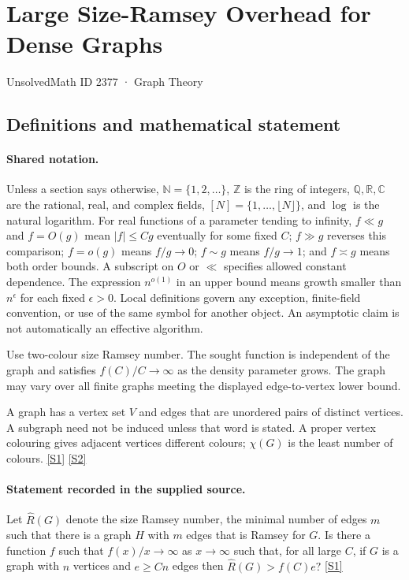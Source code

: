 \documentclass[11pt,a4paper]{article}
\newcommand{\N}{\mathbb{N}}
\newcommand{\Z}{\mathbb{Z}}
\newcommand{\Q}{\mathbb{Q}}
\newcommand{\R}{\mathbb{R}}
\newcommand{\C}{\mathbb{C}}
\newcommand{\sref}[2]{\hyperlink{source:#1:#2}{[S#2]}}
\begin{document}

\setcounter{section}{2376}

\section{Large Size-Ramsey Overhead for Dense Graphs}\label{2377}

{\small\sffamily UnsolvedMath ID 2377 · Graph Theory}

\subsection{Definitions and mathematical statement}

\paragraph{Shared notation.}Unless a section says otherwise, $\N=\{1,2,\ldots\}$,
$\Z$ is the ring of integers, $\Q,\R,\C$ are the rational, real, and complex
fields, $[N]=\{1,\ldots,\lfloor N\rfloor\}$, and $\log$ is the natural
logarithm. For real functions of a parameter tending to infinity,
$f\ll g$ and $f=O(g)$ mean $|f|\leq Cg$ eventually for some fixed $C$;
$f\gg g$ reverses this comparison; $f=o(g)$ means $f/g\to0$;
$f\sim g$ means $f/g\to1$; and $f\asymp g$ means both order bounds.
A subscript on $O$ or $\ll$ specifies allowed constant dependence.
The expression $n^{o(1)}$ in an upper bound means growth smaller than
$n^\epsilon$ for each fixed $\epsilon>0$. Local definitions govern any
exception, finite-field convention, or use of the same symbol for another
object. An asymptotic claim is not automatically an effective algorithm.



Use two-colour size Ramsey number. The sought function is independent of the graph and satisfies $f(C)/C\to\infty$ as the density parameter grows. The graph may vary over all finite graphs meeting the displayed edge-to-vertex lower bound.

A graph has a vertex set $V$ and edges that are unordered pairs of distinct vertices. A subgraph need not be induced unless that word is stated. A proper vertex colouring gives adjacent vertices different colours; $\chi(G)$ is the least number of colours. \sref{2377}{1} \sref{2377}{2}

\paragraph{Statement recorded in the supplied source.}
Let $\hat{R}(G)$ denote the size Ramsey number, the minimal number of edges $m$ such that there is a graph $H$ with $m$ edges that is Ramsey for $G$.
Is there a function $f$ such that $f(x)/x\to \infty$ as $x\to \infty$ such that, for all large $C$, if $G$ is a graph with $n$ vertices and $e\geq Cn$ edges then $ \hat{R}(G) > f(C) e? $ \sref{2377}{1}
\end{document}
